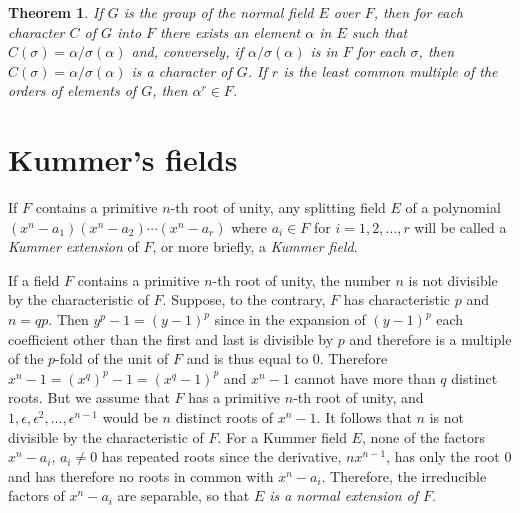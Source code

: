 \documentclass[10pt,leqno,a5paper]{book}
\newtheorem{theo}{Theorem}
\theoremstyle{definition}
\let\htw\section
\begin{document}
\begin{theo}
\label{theo:22}
If $G$ is the group of the normal field $E$ over $F$, then for each character $C$ of $G$ into $F$ there exists an element $\alpha$ in $E$ such that $C(\sigma) = \alpha / \sigma(\alpha)$ and, conversely, if $\alpha / \sigma(\alpha)$ is in $F$ for each $\sigma$, then $C(\sigma) = \alpha/\sigma(\alpha)$ is a character of $G$.
If $r$ is the least common multiple of the orders of elements of $G$, then $\alpha^r \in F$.
\end{theo}



\htw{Kummer's fields}

If $F$ contains a primitive $n$-th root of unity, any splitting field $E$ of a polynomial $(x^n - a_1)(x^n - a_2) \cdots (x^n - a_r)$ where $a_i \in F$ for $i = 1,2,\ldots,r$ will be called a \emph{Kummer extension} of $F$, or more briefly, a \emph{Kummer field}.


If a field $F$ contains a primitive $n$-th root of unity, the number $n$ is not divisible by the characteristic of $F$.
Suppose, to the contrary, $F$ has characteristic $p$ and $n = qp$.
Then $y^p - 1 = (y-1)^p$ since in the expansion of $(y-1)^p$ each coefficient other than the first and last is divisible by $p$ and therefore is a multiple of the $p$-fold of the unit of $F$ and is thus equal to $0$.
Therefore $x^n - 1 = (x^q)^p - 1 = (x^q - 1)^p$ and $x^n - 1$ cannot have more than $q$ distinct roots.
But we assume that $F$ has a primitive $n$-th root of unity, and $1, \epsilon, \epsilon^2, \ldots, \epsilon^{n-1}$ would be $n$ distinct roots of $x^n - 1$.
It follows that $n$ is not divisible by the characteristic of $F$.
For a Kummer field $E$, none of the factors $x^n - a_i$, $a_i \not= 0$ has repeated roots since the derivative, $n x^{n-1}$, has only the root $0$ and has therefore no roots in common with $x^n - a_i$.
Therefore, the irreducible factors of $x^n - a_i$ are separable, so that \emph{$E$ is a normal extension of $F$}.
\end{document}
